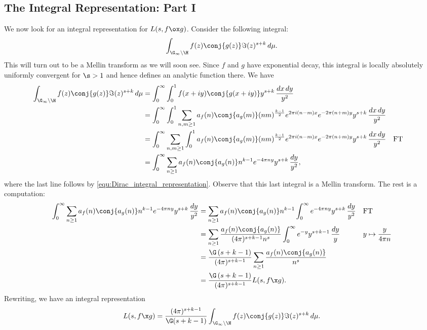     \subsection*{The Integral Representation: Part I}
      We now look for an integral representation for $L(s,f \ox g)$. Consider the following integral:
      \[
        \int_{\G_{\infty}\backslash\H}f(z)\conj{g(z)}\Im(z)^{s+k}\,d\mu.
      \]
      This will turn out to be a Mellin transform as we will soon see. Since $f$ and $g$ have exponential decay, this integral is locally absolutely uniformly convergent for $\s > 1$ and hence defines an analytic function there. We have
      \begin{align*}
        \int_{\G_{\infty}\backslash\H}f(z)\conj{g(z)}\Im(z)^{s+k}\,d\mu &= \int_{0}^{\infty}\int_{0}^{1}f(x+iy)\conj{g(x+iy)}y^{s+k}\,\frac{dx\,dy}{y^{2}} \\
        &= \int_{0}^{\infty}\int_{0}^{1}\sum_{n,m \ge 1}a_{f}(n)\conj{a_{g}(m)}(nm)^{\frac{k-1}{2}}e^{2\pi i(n-m)x}e^{-2\pi(n+m)y}y^{s+k}\,\frac{dx\,dy}{y^{2}} \\
        &= \int_{0}^{\infty}\sum_{n,m \ge 1}\int_{0}^{1}a_{f}(n)\conj{a_{g}(m)}(nm)^{\frac{k-1}{2}}e^{2\pi i(n-m)x}e^{-2\pi(n+m)y}y^{s+k}\,\frac{dx\,dy}{y^{2}} && \text{FT} \\
        &= \int_{0}^{\infty}\sum_{n \ge 1}a_{f}(n)\conj{a_{g}(n)}n^{k-1}e^{-4\pi ny}y^{s+k}\,\frac{dy}{y^{2}},
      \end{align*}
      where the last line follows by \cref{equ:Dirac_integral_representation}. Observe that this last integral is a Mellin transform. The rest is a computation:
      \begin{align*}
        \int_{0}^{\infty}\sum_{n \ge 1}a_{f}(n)\conj{a_{g}(n)}n^{k-1}e^{-4\pi ny}y^{s+k}\,\frac{dy}{y^{2}} &= \sum_{n \ge 1}a_{f}(n)\conj{a_{g}(n)}n^{k-1}\int_{0}^{\infty}e^{-4\pi ny}y^{s+k}\,\frac{dy}{y^{2}} &&\text{FT} \\
        &= \sum_{n \ge 1}\frac{a_{f}(n)\conj{a_{g}(n)}}{(4\pi)^{s+k-1}n^{s}}\int_{0}^{\infty}e^{-y}y^{s+k-1}\,\frac{dy}{y} &&\text{$y \mapsto \frac{y}{4\pi n}$} \\
        &= \frac{\G\left(s+k-1\right)}{(4\pi)^{s+k-1}}\sum_{n \ge 1}\frac{a_{f}(n)\conj{a_{g}(n)}}{n^{s}} \\
        &= \frac{\G\left(s+k-1\right)}{(4\pi)^{s+k-1}}L(s,f \x g).
      \end{align*}
      Rewriting, we have an integral representation
      \[
        L(s,f \x g) = \frac{(4\pi)^{s+k-1}}{\G(s+k-1)}\int_{\G_{\infty}\backslash\H}f(z)\conj{g(z)}\Im(z)^{s+k}\,d\mu.
      \]

